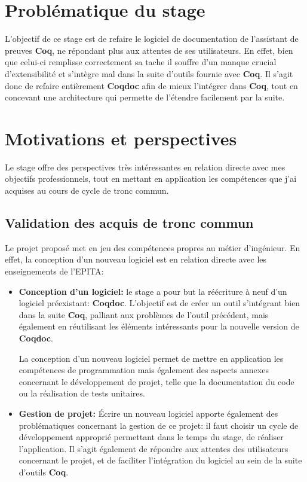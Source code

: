 \documentclass[a4paper, 11pt]{report}
\newcommand{\coq}[0]{\textbf{Coq}\xspace}
\newcommand{\coqdoc}[0]{\textbf{Coqdoc}\xspace}
\newcommand{\epita}[0]{EPITA}
\begin{document}
  \section{Problématique du stage}
  L'objectif de ce stage est de refaire le logiciel de documentation de
  l'assistant de preuves \coq, ne répondant plus aux attentes de ses
  utilisateurs.
  En effet, bien que celui-ci remplisse correctement sa tache il souffre d'un
  manque crucial d'extensibilité et s'intègre mal dans la suite d'outils
  fournie avec \coq. Il s'agit donc de refaire entièrement \coqdoc{} afin de
  mieux l'intégrer dans \coq, tout en concevant une architecture qui permette
  de l'étendre facilement par la suite.

  \section{Motivations et perspectives}
  Le stage offre des perspectives très intéressantes en relation directe
  avec mes objectifs professionnels, tout en mettant en application les
  compétences que j'ai acquises au cours de cycle de tronc commun.

  \subsection{Validation des acquis de tronc commun}
  Le projet proposé met en jeu des compétences propres au métier d'ingénieur.
  En effet, la conception d'un nouveau logiciel est en relation directe
  avec les enseignements de l'\epita:
  \begin{itemize}
    \item \textbf{Conception d'un logiciel:} le stage a pour but la réécriture à
      neuf d'un logiciel préexistant: \coqdoc. L'objectif est de créer un outil
      s'intégrant bien dans la suite \coq, palliant aux problèmes de l'outil
      précédent, mais également en réutilisant les éléments intéressants pour
      la nouvelle version de \coqdoc.

      La conception d'un nouveau logiciel permet de mettre en application
      les compétences de programmation mais également des aspects
      annexes concernant le développement de projet, telle que
      la documentation du code ou la réalisation de tests unitaires.
    \item \textbf{Gestion de projet:} Écrire un nouveau logiciel
      apporte également des problématiques concernant la gestion de
      ce projet: il faut choisir un cycle de développement
      approprié permettant dans le temps du stage, de réaliser
      l'application. Il s'agit également de répondre aux attentes
      des utilisateurs concernant le projet, et de faciliter l'intégration
      du logiciel au sein de la suite d'outils \coq.
  \end{itemize}
\end{document}
